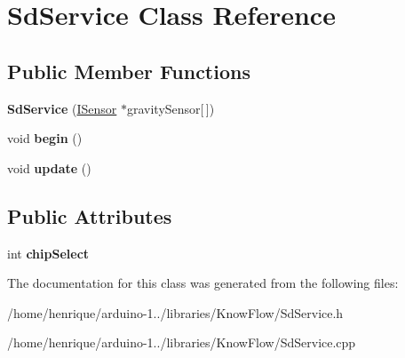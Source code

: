 \hypertarget{class_sd_service}{}\section{Sd\+Service Class Reference}
\label{class_sd_service}
\subsection*{Public Member Functions}
\begin{DoxyCompactItemize}
\item 
{\bfseries Sd\+Service} (\hyperlink{class_i_sensor}{I\+Sensor} $\ast$gravity\+Sensor\mbox{[}$\,$\mbox{]})\hypertarget{class_sd_service_afed7960e6a28c171ffe552c88cfe4624}{}\label{class_sd_service_afed7960e6a28c171ffe552c88cfe4624}

\item 
void {\bfseries begin} ()\hypertarget{class_sd_service_a5c6e09a57f22f163676a51eab6f933c5}{}\label{class_sd_service_a5c6e09a57f22f163676a51eab6f933c5}

\item 
void {\bfseries update} ()\hypertarget{class_sd_service_a776b1a8d229b9b0bc44cbf6ae9b37c9d}{}\label{class_sd_service_a776b1a8d229b9b0bc44cbf6ae9b37c9d}

\end{DoxyCompactItemize}
\subsection*{Public Attributes}
\begin{DoxyCompactItemize}
\item 
int {\bfseries chip\+Select}\hypertarget{class_sd_service_a173f33cc9797e3ce4e213a75e627d2c9}{}\label{class_sd_service_a173f33cc9797e3ce4e213a75e627d2c9}

\end{DoxyCompactItemize}


The documentation for this class was generated from the following files\+:\begin{DoxyCompactItemize}
\item 
/home/henrique/arduino-\/1../libraries/\+Know\+Flow/Sd\+Service.\+h\item 
/home/henrique/arduino-\/1../libraries/\+Know\+Flow/Sd\+Service.\+cpp\end{DoxyCompactItemize}
